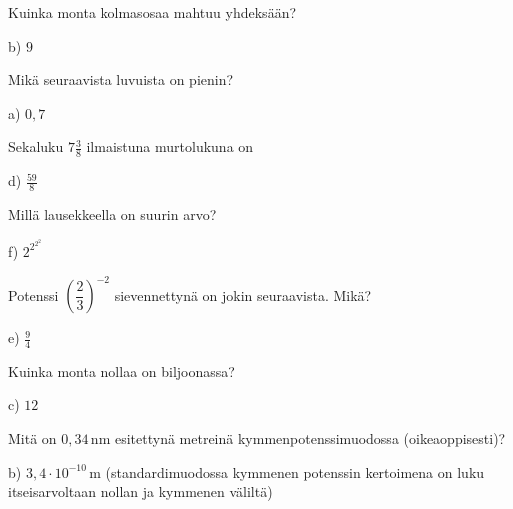 \begin{tehtava}
Kuinka monta kolmasosaa mahtuu yhdeksään?
    \begin{vastaus}
	 b) $9$
    \end{vastaus}
\end{tehtava}

\begin{tehtava}
Mikä seuraavista luvuista on pienin?
    \begin{vastaus}
	 a) $0,7$
    \end{vastaus}
\end{tehtava}

\begin{tehtava}
Sekaluku $7\frac{3}{8}$ ilmaistuna murtolukuna on
    \begin{vastaus}
	 d) $\frac{59}{8}$
    \end{vastaus}
\end{tehtava}

\begin{tehtava}
Millä lausekkeella on suurin arvo?
	\begin{vastaus}
	 f) $2^{2^{2^2}}$
	\end{vastaus}
\end{tehtava}

\begin{tehtava}
Potenssi $\left( \dfrac{2}{3} \right)^{-2}$ sievennettynä on jokin seuraavista. Mikä?
\begin{vastaus}
e) $\frac{9}{4}$
\end{vastaus}
\end{tehtava}

\begin{tehtava}
Kuinka monta nollaa on biljoonassa?
\begin{vastaus}
c) $12$
\end{vastaus}
\end{tehtava}

\begin{tehtava}
Mitä on $0,34$\,nm esitettynä metreinä kymmenpotenssimuodossa (oikeaoppisesti)?
\begin{vastaus}
b) $3,4 \cdot 10^{-10}$\,m (standardimuodossa kymmenen potenssin kertoimena on luku itseisarvoltaan nollan ja kymmenen väliltä)
\end{vastaus}
\end{tehtava}

